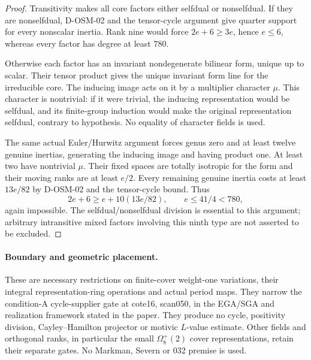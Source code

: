 \begin{proof}
Transitivity makes all core factors either selfdual or nonselfdual.
If they are nonselfdual, D-OSM-02 and the tensor-cycle argument give
quarter support for every nonscalar inertia. Rank nine would force
$2e+6\ge3e$, hence $e\le6$, whereas every factor has degree at
least $780$.

Otherwise each factor has an invariant nondegenerate bilinear form,
unique up to scalar. Their tensor product gives the unique invariant
form line for the irreducible core. The inducing image acts on it by
a multiplier character $\mu$. This character is nontrivial: if it
were trivial, the inducing representation would be selfdual, and
its finite-group induction would make the original representation
selfdual, contrary to hypothesis. No equality of character fields is
used.

The same actual Euler/Hurwitz argument forces genus zero and at least
twelve genuine inertias, generating the inducing image and having
product one. At least two have nontrivial $\mu$. Their fixed spaces
are totally isotropic for the form and their moving ranks are at least
$e/2$. Every remaining genuine inertia costs at least $13e/82$ by
D-OSM-02 and the tensor-cycle bound. Thus
\[
 2e+6\ge e+10(13e/82),\qquad e\le41/4<780,                 \tag{OSM.6}
\]
again impossible. The selfdual/nonselfdual division is essential to
this argument; arbitrary intransitive mixed factors involving this
ninth type are not asserted to be excluded.
\end{proof}

\paragraph{Boundary and geometric placement.}
These are necessary restrictions on finite-cover weight-one variations,
their integral representation-ring operations and actual period maps.
They narrow the condition-A cycle-supplier gate at cote16, scan050,
in the EGA/SGA and realization framework stated in the paper. They
produce no cycle, positivity division, Cayley--Hamilton projector or
motivic $L$-value estimate. Other fields and orthogonal ranks, in
particular the small $\Omega_8^+(2)$ cover representations, retain
their separate gates. No Markman, Severn or 032 premise is used.
